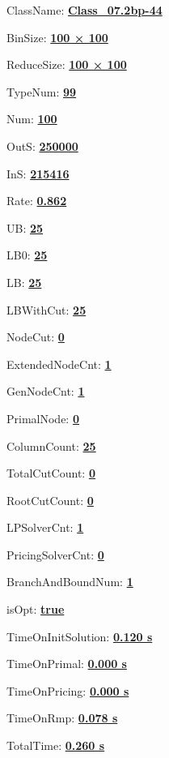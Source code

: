 \documentclass[11pt]{article}
\begin{document}
\pagestyle{empty}


ClassName: \underline{\textbf{Class_07.2bp-44}}
\par
BinSize: \underline{\textbf{100 × 100}}
\par
ReduceSize: \underline{\textbf{100 × 100}}
\par
TypeNum: \underline{\textbf{99}}
\par
Num: \underline{\textbf{100}}
\par
OutS: \underline{\textbf{250000}}
\par
InS: \underline{\textbf{215416}}
\par
Rate: \underline{\textbf{0.862}}
\par
UB: \underline{\textbf{25}}
\par
LB0: \underline{\textbf{25}}
\par
LB: \underline{\textbf{25}}
\par
LBWithCut: \underline{\textbf{25}}
\par
NodeCut: \underline{\textbf{0}}
\par
ExtendedNodeCnt: \underline{\textbf{1}}
\par
GenNodeCnt: \underline{\textbf{1}}
\par
PrimalNode: \underline{\textbf{0}}
\par
ColumnCount: \underline{\textbf{25}}
\par
TotalCutCount: \underline{\textbf{0}}
\par
RootCutCount: \underline{\textbf{0}}
\par
LPSolverCnt: \underline{\textbf{1}}
\par
PricingSolverCnt: \underline{\textbf{0}}
\par
BranchAndBoundNum: \underline{\textbf{1}}
\par
isOpt: \underline{\textbf{true}}
\par
TimeOnInitSolution: \underline{\textbf{0.120 s}}
\par
TimeOnPrimal: \underline{\textbf{0.000 s}}
\par
TimeOnPricing: \underline{\textbf{0.000 s}}
\par
TimeOnRmp: \underline{\textbf{0.078 s}}
\par
TotalTime: \underline{\textbf{0.260 s}}
\par
\newpage


\end{document}
